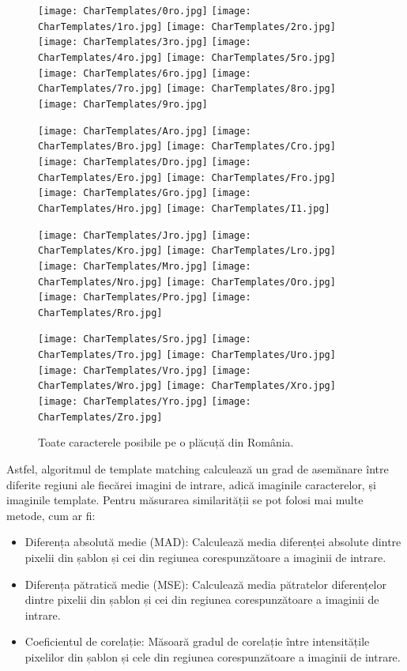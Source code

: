 \documentclass[12pt]{article}
\begin{document}
\begin{figure}[H]
  \centering
  \texttt{[image: CharTemplates/0ro.jpg]}
    \texttt{[image: CharTemplates/1ro.jpg]}
    \texttt{[image: CharTemplates/2ro.jpg]}
     \texttt{[image: CharTemplates/3ro.jpg]}
    \texttt{[image: CharTemplates/4ro.jpg]}
    \texttt{[image: CharTemplates/5ro.jpg]}
     \texttt{[image: CharTemplates/6ro.jpg]}
    \texttt{[image: CharTemplates/7ro.jpg]}
    \texttt{[image: CharTemplates/8ro.jpg]}
     \texttt{[image: CharTemplates/9ro.jpg]}
     
    \texttt{[image: CharTemplates/Aro.jpg]}
    \texttt{[image: CharTemplates/Bro.jpg]}      \texttt{[image: CharTemplates/Cro.jpg]}
    \texttt{[image: CharTemplates/Dro.jpg]}
    \texttt{[image: CharTemplates/Ero.jpg]}
    \texttt{[image: CharTemplates/Fro.jpg]}
    \texttt{[image: CharTemplates/Gro.jpg]} 
    \texttt{[image: CharTemplates/Hro.jpg]}
    \texttt{[image: CharTemplates/I1.jpg]}

    \texttt{[image: CharTemplates/Jro.jpg]}
    \texttt{[image: CharTemplates/Kro.jpg]}      \texttt{[image: CharTemplates/Lro.jpg]}
    \texttt{[image: CharTemplates/Mro.jpg]}
    \texttt{[image: CharTemplates/Nro.jpg]}
    \texttt{[image: CharTemplates/Oro.jpg]}
    \texttt{[image: CharTemplates/Pro.jpg]} 
     \texttt{[image: CharTemplates/Rro.jpg]}

        \texttt{[image: CharTemplates/Sro.jpg]}
    \texttt{[image: CharTemplates/Tro.jpg]} 
    \texttt{[image: CharTemplates/Uro.jpg]}
    \texttt{[image: CharTemplates/Vro.jpg]}
    \texttt{[image: CharTemplates/Wro.jpg]}
    \texttt{[image: CharTemplates/Xro.jpg]} 
    \texttt{[image: CharTemplates/Yro.jpg]}
    \texttt{[image: CharTemplates/Zro.jpg]}
  \caption{Toate caracterele posibile pe o pl\u{a}cuț\u{a} din Rom\^{a}nia.}
  \label{fig:recunoastere_set_chars}
\end{figure}

Astfel, algoritmul de template matching calculeaz\u{a} un grad de asem\u{a}nare \^{i}ntre diferite regiuni ale fiec\u{a}rei imagini de intrare, adic\u{a} imaginile caracterelor, și imaginile template. Pentru m\u{a}surarea similarit\u{a}ții se pot folosi mai multe metode, cum ar fi:

\begin{itemize}
    \item Diferența absolut\u{a} medie (MAD): Calculeaz\u{a} media diferenței absolute dintre pixelii din șablon și cei din regiunea corespunz\u{a}toare a imaginii de intrare.
    \item Diferența p\u{a}tratic\u{a} medie (MSE): Calculeaz\u{a} media p\u{a}tratelor diferențelor dintre pixelii din șablon și cei din regiunea corespunz\u{a}toare a imaginii de intrare.
    \item Coeficientul de corelație: M\u{a}soar\u{a} gradul de corelație \^{i}ntre intensit\u{a}țile pixelilor din șablon și cele din regiunea corespunz\u{a}toare a imaginii de intrare.
\end{itemize}
\end{document}
